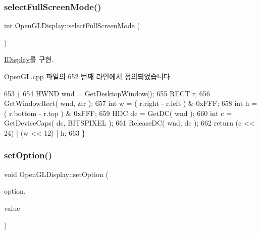 \subsubsection{\texorpdfstring{select\+Full\+Screen\+Mode()}{selectFullScreenMode()}}
{\footnotesize\ttfamily \mbox{\hyperlink{_util_8cpp_a0ef32aa8672df19503a49fab2d0c8071}{int}} Open\+G\+L\+Display\+::select\+Full\+Screen\+Mode (\begin{DoxyParamCaption}\item[{G\+U\+ID $\ast$$\ast$}]{ }\end{DoxyParamCaption})\hspace{0.3cm}{\ttfamily [virtual]}}



\mbox{\hyperlink{class_i_display_a2f7a55f63c5e4b24245aa88228afab68}{I\+Display}}를 구현.



Open\+G\+L.\+cpp 파일의 652 번째 라인에서 정의되었습니다.


\begin{DoxyCode}
653 \{
654     HWND wnd = GetDesktopWindow();
655     RECT r;
656     GetWindowRect( wnd, &r );
657     \textcolor{keywordtype}{int} w = ( r.right - r.left ) & 0xFFF;
658     \textcolor{keywordtype}{int} h = ( r.bottom - r.top ) & 0xFFF;
659     HDC dc = GetDC( wnd );
660     \textcolor{keywordtype}{int} c = GetDeviceCaps( dc, BITSPIXEL );
661     ReleaseDC( wnd, dc );
662     \textcolor{keywordflow}{return} (c << 24) | (w << 12) | h;
663 \}
\end{DoxyCode}
\mbox{\label{class_open_g_l_display_ad92750f75fabf5873f8626cb154f29b9}} 
\subsubsection{\texorpdfstring{set\+Option()}{setOption()}}
{\footnotesize\ttfamily void Open\+G\+L\+Display\+::set\+Option (\begin{DoxyParamCaption}\item[{\mbox{\hyperlink{getopt1_8c_a2c212835823e3c54a8ab6d95c652660e}{const}} char $\ast$}]{option,  }\item[{\mbox{\hyperlink{_util_8cpp_a0ef32aa8672df19503a49fab2d0c8071}{int}}}]{value }\end{DoxyParamCaption})\hspace{0.3cm}{\ttfamily [virtual]}}




